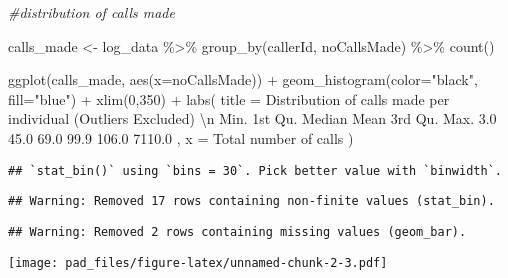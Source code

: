 \documentclass[
]{article}
\newenvironment{Shaded}{\begin{snugshade}}{\end{snugshade}}
\newcommand{\AttributeTok}[1]{\textcolor[rgb]{0.77,0.63,0.00}{#1}}
\newcommand{\CommentTok}[1]{\textcolor[rgb]{0.56,0.35,0.01}{\textit{#1}}}
\newcommand{\DecValTok}[1]{\textcolor[rgb]{0.00,0.00,0.81}{#1}}
\newcommand{\FunctionTok}[1]{\textcolor[rgb]{0.00,0.00,0.00}{#1}}
\newcommand{\NormalTok}[1]{#1}
\newcommand{\OtherTok}[1]{\textcolor[rgb]{0.56,0.35,0.01}{#1}}
\newcommand{\SpecialCharTok}[1]{\textcolor[rgb]{0.00,0.00,0.00}{#1}}
\newcommand{\StringTok}[1]{\textcolor[rgb]{0.31,0.60,0.02}{#1}}
\begin{document}
\begin{Shaded}
\begin{Highlighting}[]
\CommentTok{\#distribution of calls made}

\NormalTok{calls\_made }\OtherTok{\textless{}{-}}\NormalTok{ log\_data }\SpecialCharTok{\%\textgreater{}\%}
  \FunctionTok{group\_by}\NormalTok{(callerId, noCallsMade) }\SpecialCharTok{\%\textgreater{}\%}
  \FunctionTok{count}\NormalTok{()}

\FunctionTok{ggplot}\NormalTok{(calls\_made, }\FunctionTok{aes}\NormalTok{(}\AttributeTok{x=}\NormalTok{noCallsMade)) }\SpecialCharTok{+}
  \FunctionTok{geom\_histogram}\NormalTok{(}\AttributeTok{color=}\StringTok{"black"}\NormalTok{, }\AttributeTok{fill=}\StringTok{"blue"}\NormalTok{) }\SpecialCharTok{+}
  \FunctionTok{xlim}\NormalTok{(}\DecValTok{0}\NormalTok{,}\DecValTok{350}\NormalTok{) }\SpecialCharTok{+}
  \FunctionTok{labs}\NormalTok{(}
    \AttributeTok{title =} \StringTok{\textquotesingle{}Distribution of calls made per individual (Outliers Excluded) }\SpecialCharTok{\textbackslash{}n}
\StringTok{Min. 1st Qu.  Median  Mean   3rd Qu.    Max. }
\StringTok{    3.0    45.0    69.0     99.9    106.0    7110.0 \textquotesingle{}}\NormalTok{,}
    \AttributeTok{x =} \StringTok{\textquotesingle{}Total number of calls\textquotesingle{}}
\NormalTok{  )}
\end{Highlighting}
\end{Shaded}

\begin{verbatim}
## `stat_bin()` using `bins = 30`. Pick better value with `binwidth`.
\end{verbatim}

\begin{verbatim}
## Warning: Removed 17 rows containing non-finite values (stat_bin).
\end{verbatim}

\begin{verbatim}
## Warning: Removed 2 rows containing missing values (geom_bar).
\end{verbatim}

\texttt{[image: pad\_files/figure-latex/unnamed-chunk-2-3.pdf]}
\end{document}
